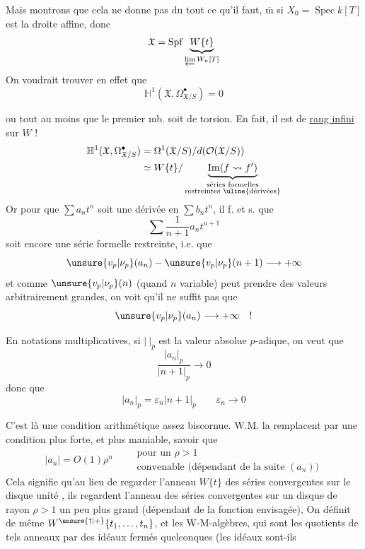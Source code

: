 Mais montrons que cela ne donne pas du tout ce qu'il faut, $\overline{\mathrm m}$ si $X_0=\operatorname{Spec} k[T]$ est la droite affine, donc
\[
\mathfrak X=\operatorname{Spf}
\underbrace{W\{t\}}_{\varprojlim W_n[T]}
\]
On voudrait trouver en effet que
\[
\mathbb H^1(\mathfrak X,\Omega^\bullet_{\mathfrak X/S})=0
\]



ou tout au moins que le premier mb. soit de torsion. En fait, il est de \uline{rang infini} sur $W$ !
\[
\begin{aligned}
\mathbb H^1(\mathfrak X,\Omega^\bullet_{\mathfrak X/S})
&=\Omega^1(\mathfrak X/S)/d(\mathcal O(\mathfrak X/S))\\
&\simeq W\{t\}/\underbrace{\operatorname{Im}(f\rightsquigarrow f')}_{\substack{\text{séries formelles}\\\text{restreintes }\uline{\text{dérivées}}}}
\end{aligned}
\]
Or pour que $\sum a_n t^n$ soit une dérivée en $\sum b_n t^n$, il f. et s. que
\[
\sum\frac1{n+1}a_n t^{n+1}
\]
soit encore une série formelle restreinte, i.e. que
\[
\unsure{v_p|\nu_p}(a_n)-\unsure{v_p|\nu_p}(n+1)\longrightarrow+\infty
\]
et comme $\unsure{v_p|\nu_p}(n)$ (quand $n$ variable) peut prendre des valeurs arbitrairement grandes, on voit qu'il ne suffit pas que
\[
\unsure{v_p|\nu_p}(a_n)\longrightarrow+\infty\quad !
\]

En notations multiplicatives, si $|\ |_{p}$ est la valeur absolue $p$-adique,  on veut que
\[
\frac{|a_n|_p}{|n+1|_p}\longrightarrow 0
\]
donc que
\[
|a_n|_p=\varepsilon_n|n+1|_p\qquad \varepsilon_n\longrightarrow 0
\]



C'est là une condition  arithmétique assez biscornue. W.M. la remplacent par une condition plus forte, et plus maniable, savoir que
\[
|a_n|=O(1)\rho^n
\qquad
\begin{gathered}
\text{pour un }\rho>1\\
\text{convenable (dépendant de la suite }(a_n)\text{)}
\end{gathered}
\]
Cela signifie qu'au lieu de regarder l'anneau $W\{t\}$ des séries convergentes sur le disque unité , ils regardent l'anneau  des séries convergentes sur un disque de rayon $\rho>1$  un peu plus grand (dépendant de la fonction envisagée), On définit de même $W^{\unsure{\dagger|+}}\{t_1,\ldots,t_n\}$, et les  W-M-algèbres,  qui sont les quotients de tels anneaux par des idéaux  fermés quelconques  (les idéaux sont-ils

